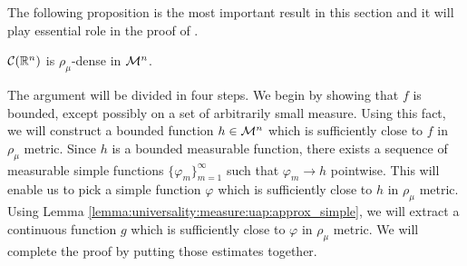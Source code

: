 The following proposition is the most important result in this section and it will play essential role in the proof of .
\begin{proposition}
\label{proposition:universality:measure:continuous_dense_mn}
$\mathcal{C}({\mathbb R}^n)$ is $\rho_\mu$-dense in ${\mathcal M}^n$.
\end{proposition}
\begin{proof-idea*} The argument will be divided in four steps. We begin by showing that $f$ is bounded, except possibly on a set of arbitrarily small measure.
Using this fact, we will construct a bounded function $h \in {\mathcal M}^n$ which is sufficiently close to $f$ in $\rho_\mu$ metric. Since $h$ is a bounded measurable function, there exists a sequence of measurable simple functions $\{ \varphi_m \}_{m=1}^\infty$ such that $\varphi_m \to h$ pointwise. This will enable us to pick a simple function $\varphi$ which is sufficiently close to $h$ in $\rho_\mu$ metric. Using Lemma \ref{lemma:universality:measure:uap:approx_simple}, we will extract a continuous function $g$ which is sufficiently close to $\varphi$ in $\rho_\mu$ metric. We will complete the proof by putting those estimates together.  
\end{proof-idea*}
